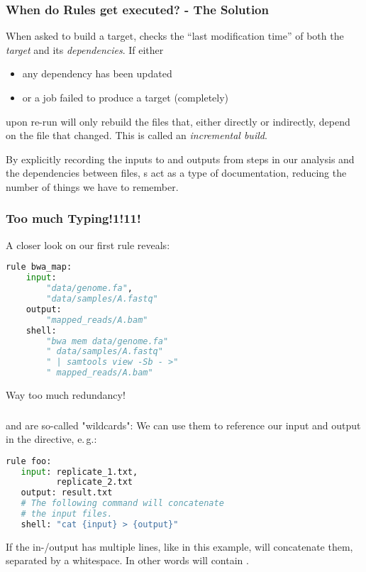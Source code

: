 \begin{frame}
  \frametitle{When do Rules get executed? - The Solution}
  When asked to build a target, \Snakemake{} checks the “last modification time” of both the \emph{target} and its \emph{dependencies}.
  If either
  \begin{itemize}
   \item any dependency has been updated
   \item or a job failed to produce a target (completely)
  \end{itemize}
  upon re-run \Snakemake{} will only rebuild the files that, either directly or indirectly, depend on the file that changed. This is called an \emph{incremental build}.
  \pause
  \begin{docs}
  	By explicitly recording the inputs to and outputs from steps in our analysis and the dependencies between files, s act as a type of documentation, reducing the number of things we have to remember.
  \end{docs}
\end{frame}

\begin{frame}[fragile]
  \frametitle{Too much Typing!1!11!}
  A closer look on our first rule reveals:
  \begin{lstlisting}[language=Python,style=Python]
rule bwa_map:
    input:
        "data/genome.fa",
        "data/samples/A.fastq"
    output:
        "mapped_reads/A.bam"
    shell:
        "bwa mem data/genome.fa"
        " data/samples/A.fastq"
        " | samtools view -Sb - >"
        " mapped_reads/A.bam"
    \end{lstlisting}
    \bcattention Way too much redundancy!
\end{frame}

\begin{frame}[fragile]
	\frametitle{}
	 and  are so-called "wildcards": We can use them 
	to reference our input and output in the  directive, e.\,g.:
	\begin{lstlisting}[language=Python,style=Python]
rule foo:
   input: replicate_1.txt,
          replicate_2.txt
   output: result.txt
   # The following command will concatenate
   # the input files.
   shell: "cat {input} > {output}"
    \end{lstlisting}
    \begin{docs}
      If the in-/output has multiple lines, like in this example, \Snakemake{} will concatenate them, separated by a whitespace. In other words  will contain .
    \end{docs}
\end{frame}

